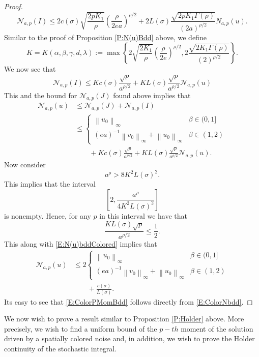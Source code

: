 \documentclass[a4paper,11pt]{article}
\numberwithin{equation}{section}
\theoremstyle{plain}
\theoremstyle{definition}
\newcommand{\Norm}[1]{\left\|  #1   \right\|}
\numberwithin{NQ}{section}
\numberwithin{LQ}{section}
\numberwithin{ZQ}{section}
\begin{document}
\begin{proof}
\begin{equation*}
	\mathcal{N}_{a,p}(I)\le	2c(\sigma)\sqrt{\frac{2p K_1}{\rho}} \left(\frac{\rho}{2ea}\right)^{\rho/2}  + 2L(\sigma)\frac{\sqrt{2p K_1 \Gamma(\rho) }}{ (2a)^{\rho/2}}N_{a,p}(u).
	\end{equation*}
  Similar to the proof of Proposition \ref{P:N(u)Bdd} above, we define
	\[
	K = K(\alpha,\beta,\gamma,d, \lambda):= \max \left\{2\sqrt{\frac{2 K_1}{\rho}} \left(\frac{\rho}{2e}\right)^{\rho/2},   2\frac{\sqrt{2 K_1 \Gamma(\rho) }}{ (2)^{\rho/2}} \right\}.
	\]
  We now see that
	\begin{equation}
	\mathcal{N}_{a,p}(I)\le K c(\sigma)\frac{\sqrt{p}}{ a^{\rho /2}} + K L(\sigma) \frac{\sqrt{p}}{ a^{\rho/2}} \mathcal{N}_{a,p}(u)
	\end{equation}
  This and the bound for $\mathcal{N}_{a,p}(J)$ found above implies that
	\begin{align}
	\mathcal{N}_{a,p}(u) &\le \mathcal{N}_{a,p}(J) + \mathcal{N}_{a,p}(I) \nonumber \\
	& \le \begin{cases}
	\Norm{u_0}_{\infty}                                & \beta \in (0,1] \nonumber \\
	(ea)^{-1}\Norm{v_0}_{\infty} + \Norm{u_0}_{\infty} & \beta \in (1,2)
	\end{cases} \\
	& \qquad + K c(\sigma)\frac{\sqrt{p}}{ a^{\rho /2}} + K L(\sigma) \frac{\sqrt{p}}{ a^{\rho/2}} \mathcal{N}_{a,p}(u) \label{E:N(u)bddColored}.
	\end{align}
  Now consider
	\[
	a^\rho > 8K^2L(\sigma)^2.
	\]
  This implies that the interval
	\[
	\left[2, \frac{a^\rho}{4K^2L(\sigma)^2}  \right]
	\]
  is nonempty. Hence, for any $p$ in this interval we have that
	\[
	\frac{KL(\sigma)\sqrt{p}}{a^{\rho/2}} \le \frac{1}{2}.
	\]
  This along with \eqref{E:N(u)bddColored} implies that
	\begin{align*}
	\mathcal{N}_{a,p}(u) &\le 2\begin{cases}
	\Norm{u_0}_{\infty} & \beta \in (0,1] \nonumber \\
	(ea)^{-1}\Norm{v_0}_{\infty} + \Norm{u_0}_{\infty} & \beta \in (1,2)
	\end{cases} \\
	& \qquad + \frac{c(\sigma)}{L(\sigma)}.
	\end{align*}
  Its easy to see that \eqref{E:ColorPMomBdd} follows directly from \eqref{E:ColorNbdd}.
\end{proof}

We now wish to prove a result similar to Proposition \ref{P:Holder} above. More precisely, we wish
to find a uniform bound of the $p-th$ moment of the solution driven by a spatially colored noise
and, in addition, we wish to prove the Holder continuity of the stochastic integral.
\end{document}
